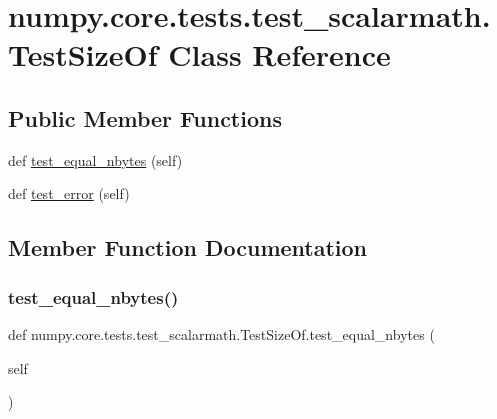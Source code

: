 \hypertarget{classnumpy_1_1core_1_1tests_1_1test__scalarmath_1_1TestSizeOf}{}\section{numpy.\+core.\+tests.\+test\+\_\+scalarmath.\+Test\+Size\+Of Class Reference}
\label{classnumpy_1_1core_1_1tests_1_1test__scalarmath_1_1TestSizeOf}
\subsection*{Public Member Functions}
\begin{DoxyCompactItemize}
\item 
def \hyperlink{classnumpy_1_1core_1_1tests_1_1test__scalarmath_1_1TestSizeOf_a48664723f6a1b9feb279798471b9f6c1}{test\+\_\+equal\+\_\+nbytes} (self)
\item 
def \hyperlink{classnumpy_1_1core_1_1tests_1_1test__scalarmath_1_1TestSizeOf_ace7d29e6f123c2d55b359662472cd9ba}{test\+\_\+error} (self)
\end{DoxyCompactItemize}


\subsection{Member Function Documentation}
\mbox{\label{classnumpy_1_1core_1_1tests_1_1test__scalarmath_1_1TestSizeOf_a48664723f6a1b9feb279798471b9f6c1}} 
\subsubsection{\texorpdfstring{test\+\_\+equal\+\_\+nbytes()}{test\_equal\_nbytes()}}
{\footnotesize\ttfamily def numpy.\+core.\+tests.\+test\+\_\+scalarmath.\+Test\+Size\+Of.\+test\+\_\+equal\+\_\+nbytes (\begin{DoxyParamCaption}\item[{}]{self }\end{DoxyParamCaption})}

